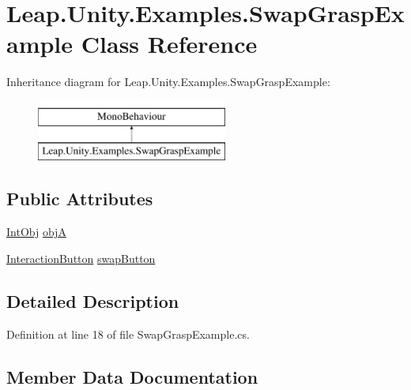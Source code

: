 \hypertarget{class_leap_1_1_unity_1_1_examples_1_1_swap_grasp_example}{}\section{Leap.\+Unity.\+Examples.\+Swap\+Grasp\+Example Class Reference}
\label{class_leap_1_1_unity_1_1_examples_1_1_swap_grasp_example}
Inheritance diagram for Leap.\+Unity.\+Examples.\+Swap\+Grasp\+Example\+:\begin{figure}[H]
\begin{center}
\leavevmode
\includegraphics[height=2.000000cm]{class_leap_1_1_unity_1_1_examples_1_1_swap_grasp_example}
\end{center}
\end{figure}
\subsection*{Public Attributes}
\begin{DoxyCompactItemize}
\item 
\mbox{\hyperlink{namespace_leap_1_1_unity_1_1_examples_a009a8c553109ae98a972c43c460d0041}{Int\+Obj}} \mbox{\hyperlink{class_leap_1_1_unity_1_1_examples_1_1_swap_grasp_example_af2944977cfc97cf74f06613c5b01f6ad}{objA}}
\item 
\mbox{\hyperlink{class_leap_1_1_unity_1_1_interaction_1_1_interaction_button}{Interaction\+Button}} \mbox{\hyperlink{class_leap_1_1_unity_1_1_examples_1_1_swap_grasp_example_a1aca750068585029a35a8cca2adfa7aa}{swap\+Button}}
\end{DoxyCompactItemize}


\subsection{Detailed Description}


Definition at line 18 of file Swap\+Grasp\+Example.\+cs.



\subsection{Member Data Documentation}
\mbox{\label{class_leap_1_1_unity_1_1_examples_1_1_swap_grasp_example_af2944977cfc97cf74f06613c5b01f6ad}} 
